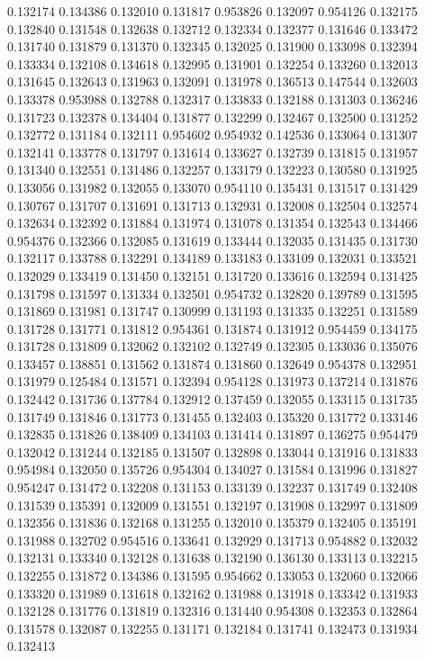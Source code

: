 0.132174
0.134386
0.132010
0.131817
0.953826
0.132097
0.954126
0.132175
0.132840
0.131548
0.132638
0.132712
0.132334
0.132377
0.131646
0.133472
0.131740
0.131879
0.131370
0.132345
0.132025
0.131900
0.133098
0.132394
0.133334
0.132108
0.134618
0.132995
0.131901
0.132254
0.133260
0.132013
0.131645
0.132643
0.131963
0.132091
0.131978
0.136513
0.147544
0.132603
0.133378
0.953988
0.132788
0.132317
0.133833
0.132188
0.131303
0.136246
0.131723
0.132378
0.134404
0.131877
0.132299
0.132467
0.132500
0.131252
0.132772
0.131184
0.132111
0.954602
0.954932
0.142536
0.133064
0.131307
0.132141
0.133778
0.131797
0.131614
0.133627
0.132739
0.131815
0.131957
0.131340
0.132551
0.131486
0.132257
0.133179
0.132223
0.130580
0.131925
0.133056
0.131982
0.132055
0.133070
0.954110
0.135431
0.131517
0.131429
0.130767
0.131707
0.131691
0.131713
0.132931
0.132008
0.132504
0.132574
0.132634
0.132392
0.131884
0.131974
0.131078
0.131354
0.132543
0.134466
0.954376
0.132366
0.132085
0.131619
0.133444
0.132035
0.131435
0.131730
0.132117
0.133788
0.132291
0.134189
0.133183
0.133109
0.132031
0.133521
0.132029
0.133419
0.131450
0.132151
0.131720
0.133616
0.132594
0.131425
0.131798
0.131597
0.131334
0.132501
0.954732
0.132820
0.139789
0.131595
0.131869
0.131981
0.131747
0.130999
0.131193
0.131335
0.132251
0.131589
0.131728
0.131771
0.131812
0.954361
0.131874
0.131912
0.954459
0.134175
0.131728
0.131809
0.132062
0.132102
0.132749
0.132305
0.133036
0.135076
0.133457
0.138851
0.131562
0.131874
0.131860
0.132649
0.954378
0.132951
0.131979
0.125484
0.131571
0.132394
0.954128
0.131973
0.137214
0.131876
0.132442
0.131736
0.137784
0.132912
0.137459
0.132055
0.133115
0.131735
0.131749
0.131846
0.131773
0.131455
0.132403
0.135320
0.131772
0.133146
0.132835
0.131826
0.138409
0.134103
0.131414
0.131897
0.136275
0.954479
0.132042
0.131244
0.132185
0.131507
0.132898
0.133044
0.131916
0.131833
0.954984
0.132050
0.135726
0.954304
0.134027
0.131584
0.131996
0.131827
0.954247
0.131472
0.132208
0.131153
0.133139
0.132237
0.131749
0.132408
0.131539
0.135391
0.132009
0.131551
0.132197
0.131908
0.132997
0.131809
0.132356
0.131836
0.132168
0.131255
0.132010
0.135379
0.132405
0.135191
0.131988
0.132702
0.954516
0.133641
0.132929
0.131713
0.954882
0.132032
0.132131
0.133340
0.132128
0.131638
0.132190
0.136130
0.133113
0.132215
0.132255
0.131872
0.134386
0.131595
0.954662
0.133053
0.132060
0.132066
0.133320
0.131989
0.131618
0.132162
0.131988
0.131918
0.133342
0.131933
0.132128
0.131776
0.131819
0.132316
0.131440
0.954308
0.132353
0.132864
0.131578
0.132087
0.132255
0.131171
0.132184
0.131741
0.132473
0.131934
0.132413
